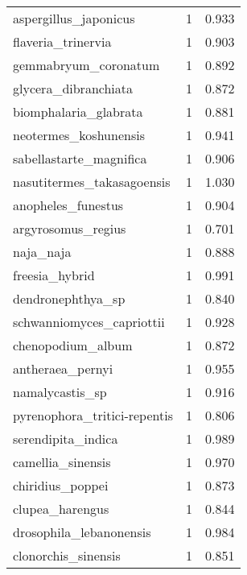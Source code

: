 \begin{tabular}{lrr}
          aspergillus\_japonicus &                   1 &     0.933 \\
             flaveria\_trinervia &                   1 &     0.903 \\
           gemmabryum\_coronatum &                   1 &     0.892 \\
           glycera\_dibranchiata &                   1 &     0.872 \\
          biomphalaria\_glabrata &                   1 &     0.881 \\
          neotermes\_koshunensis &                   1 &     0.941 \\
        sabellastarte\_magnifica &                   1 &     0.906 \\
     nasutitermes\_takasagoensis &                   1 &     1.030 \\
             anopheles\_funestus &                   1 &     0.904 \\
             argyrosomus\_regius &                   1 &     0.701 \\
                      naja\_naja &                   1 &     0.888 \\
                 freesia\_hybrid &                   1 &     0.991 \\
              dendronephthya\_sp &                   1 &     0.840 \\
      schwanniomyces\_capriottii &                   1 &     0.928 \\
              chenopodium\_album &                   1 &     0.872 \\
               antheraea\_pernyi &                   1 &     0.955 \\
                namalycastis\_sp &                   1 &     0.916 \\
   pyrenophora\_tritici-repentis &                   1 &     0.806 \\
             serendipita\_indica &                   1 &     0.989 \\
              camellia\_sinensis &                   1 &     0.970 \\
               chiridius\_poppei &                   1 &     0.873 \\
                clupea\_harengus &                   1 &     0.844 \\
        drosophila\_lebanonensis &                   1 &     0.984 \\
            clonorchis\_sinensis &                   1 &     0.851 \\

\end{tabular}
